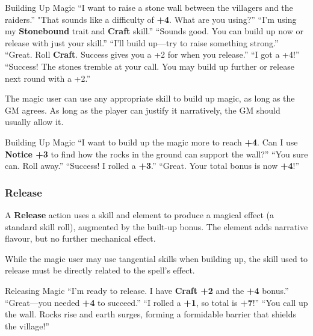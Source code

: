 \begin{ExampleGame}{Building Up Magic}
    \line[Player] “I want to raise a stone wall between the villagers and the raiders.”
    \line[GM]     "That sounds like a difficulty of \textbf{+4}. What are you using?”
    \line[Player] “I’m using my \textbf{Stonebound} trait and \textbf{Craft} skill.”
    \line[GM]     “Sounds good. You can build up now or release with just your skill.”
    \line[Player] “I’ll build up—try to raise something strong.”
    \line[GM]     “Great. Roll \textbf{Craft}. Success gives you a +2 for when you release.”
    \line[Player] “I got a +4!”
    \line[GM]     “Success! The stones tremble at your call. You may build up further or release next round with a +2.”
\end{ExampleGame}

The magic user can use any appropriate skill to build up magic, as long as the GM agrees. As long as the player can justify it narratively, the GM should usually allow it.

\begin{ExampleGame}{Building Up Magic}
    \line[Player] “I want to build up the magic more to reach \textbf{+4}. Can I use \textbf{Notice +3} to find how the rocks in the ground can support the wall?”
    \line[GM]     “You sure can. Roll away.”
    \line[Player] “Success! I rolled a \textbf{+3}.”
    \line[GM]     “Great. Your total bonus is now \textbf{+4}!”
\end{ExampleGame}

\subsubsection{Release}

A \textbf{Release} action uses a skill and element to produce a magical effect (a standard skill roll), augmented by the built-up bonus. The element adds narrative flavour, but no further mechanical effect.

While the magic user may use tangential skills when building up, the skill used to release must be directly related to the spell’s effect.

\begin{ExampleGame}{Releasing Magic}
    \line[Player] “I’m ready to release. I have \textbf{Craft +2} and the \textbf{+4} bonus.”
    \line[GM]     “Great—you needed \textbf{+4} to succeed.”
    \line[Player] “I rolled a \textbf{+1}, so total is \textbf{+7}!”
    \line[GM]     “You call up the wall. Rocks rise and earth surges, forming a formidable barrier that shields the village!”
\end{ExampleGame}

